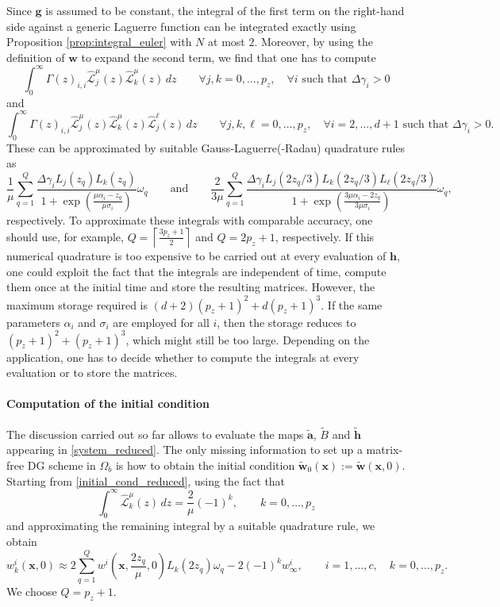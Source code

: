\documentclass{article}
\newcommand{\gbf}{\mathbf{g}}
\newcommand{\wbf}{\mathbf{w}}
\newcommand{\hbf}{\mathbf{h}}
\newcommand{\xbf}{\mathbf{x}}
\newcommand{\atbf}{\widetilde{\mathbf{a}}}
\newcommand{\Btbf}{\widetilde{B}}
\newcommand{\htbf}{\widetilde{\mathbf{h}}}
\newcommand{\wtbf}{\widetilde{\mathbf{w}}}
\newcommand{\cLh}{\hat{\mathscr{L}}}
\begin{document}
	Since $\gbf$ is assumed to be constant, the integral of the first term on the right-hand side against a generic Laguerre function can be integrated exactly using Proposition \ref{prop:integral_euler} with $N$ at most $2$. Moreover, by using the definition of $\wbf$ to expand the second term, we find that one has to compute
	\begin{equation*}
		\int_0^\infty \Gamma(z)_{i,i}\cLh_j^\mu(z)\cLh_k^\mu(z)\,dz \qquad \forall j,k=0,\dots,p_z,\quad \forall i \text{ such that } \Delta\gamma_i>0
	\end{equation*}
	and
	\begin{equation*}
		\int_0^\infty \Gamma(z)_{i,i}\cLh_j^\mu(z)\cLh_k^\mu(z)\cLh_j^\ell(z)\,dz \qquad \forall j,k,\ell=0,\dots,p_z,\quad \forall i=2,\dots,d+1 \text{ such that } \Delta\gamma_i>0.
	\end{equation*}
	These can be approximated by suitable Gauss-Laguerre(-Radau) quadrature rules as
	\begin{equation*}
		\frac{1}{\mu}\sum_{q=1}^Q\frac{\Delta\gamma_iL_j(z_q)L_k(z_q)}{1+\exp\left(\frac{\mu\alpha_i-z_q}{\mu\sigma_i}\right)}\omega_q \qquad \text{and} \qquad \frac{2}{3\mu}\sum_{q=1}^Q\frac{\Delta\gamma_iL_j(2z_q/3)L_k(2z_q/3)L_\ell(2z_q/3)}{1+\exp\left(\frac{3\mu\alpha_i-2z_q}{3\mu\sigma_i}\right)}\omega_q,
	\end{equation*}
	respectively. To approximate these integrals with comparable accuracy, one should use, for example, $Q=\left\lceil\frac{3p_z+1}{2}\right\rceil$ and $Q=2p_z+1$, respectively. If this numerical quadrature is too expensive to be carried out at every evaluation of $\hbf$, one could exploit the fact that the integrals are independent of time, compute them once at the initial time and store the resulting matrices. However, the maximum storage required is $(d+2)(p_z+1)^2+d(p_z+1)^3$. If the same parameters $\alpha_i$ and $\sigma_i$ are employed for all $i$, then the storage reduces to $(p_z+1)^2+(p_z+1)^3$, which might still be too large. Depending on the application, one has to decide whether to compute the integrals at every evaluation or to store the matrices.
	
\paragraph{Computation of the initial condition}
The discussion carried out so far allows to evaluate the maps $\atbf$, $\Btbf$ and $\htbf$ appearing in \eqref{system_reduced}. The only missing information to set up a matrix-free DG scheme in $\Omega_b$ is how to obtain the initial condition $\wtbf_0(\xbf):=\wtbf(\xbf,0)$. Starting from \eqref{initial_cond_reduced}, using the fact that
\begin{equation*}
	\int_0^\infty\cLh_k^\mu(z)\,dz = \frac{2}{\mu}(-1)^k, \qquad k=0,\dots,p_z
\end{equation*}
and approximating the remaining integral by a suitable quadrature rule, we obtain 
\begin{equation*}
	w_k^i(\xbf,0)\approx2\sum_{q=1}^Qw^i\left(\xbf,\frac{2z_q}{\mu},0\right)L_k(2z_q)\omega_q-2(-1)^kw^i_\infty, \qquad i=1,\dots,c, \quad k=0,\dots,p_z.
\end{equation*}
We choose $Q=p_z+1$.
\end{document}
